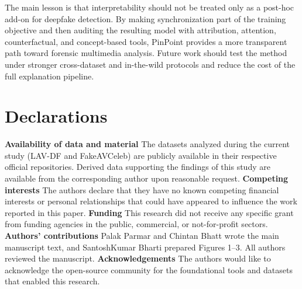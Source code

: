 \documentclass[pdflatex,sn-mathphys-num]{sn-jnl}
\begin{document}
The main lesson is that interpretability should not be treated only as a post-hoc add-on for deepfake detection. By making synchronization part of the training objective and then auditing the resulting model with attribution, attention, counterfactual, and concept-based tools, PinPoint provides a more transparent path toward forensic multimedia analysis. Future work should test the method under stronger cross-dataset and in-the-wild protocols and reduce the cost of the full explanation pipeline.


\section{Declarations}

\textbf{Availability of data and material}
The datasets analyzed during the current study (LAV-DF and FakeAVCeleb) are publicly available in their
respective official repositories. Derived data supporting the findings of this study are available from the corresponding author upon reasonable request.\newline
\textbf{Competing interests} 
The authors declare that they have no known competing financial interests or personal relationships that could have appeared to influence the work reported in this paper. \newline
\textbf{Funding}
This research did not receive any specific grant from funding agencies in the public, commercial, or not-for-profit sectors. \newline
\textbf{Authors' contributions}
Palak Parmar and Chintan Bhatt wrote the main manuscript text, and SantoshKumar Bharti prepared Figures 1--3. All authors reviewed the manuscript. \newline
\textbf{Acknowledgements} 
The authors would like to acknowledge the open-source community for the foundational tools and datasets
that enabled this research.

\backmatter
\end{document}
